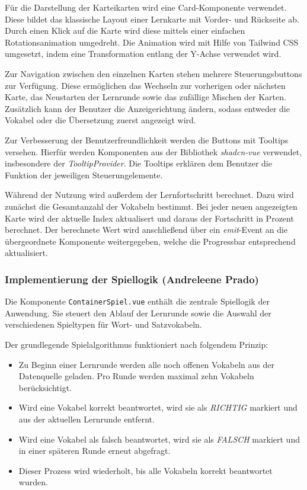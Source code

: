 Für die Darstellung der Karteikarten wird eine Card-Komponente verwendet.
Diese bildet das klassische Layout einer Lernkarte mit Vorder- und Rückseite ab.
Durch einen Klick auf die Karte wird diese mittels einer einfachen Rotationsanimation umgedreht.
Die Animation wird mit Hilfe von Tailwind CSS umgesetzt, indem eine Transformation entlang der Y-Achse verwendet wird.

Zur Navigation zwischen den einzelnen Karten stehen mehrere Steuerungsbuttons zur Verfügung.
Diese ermöglichen das Wechseln zur vorherigen oder nächsten Karte, das Neustarten der Lernrunde sowie das zufällige Mischen der Karten.
Zusätzlich kann der Benutzer die Anzeigerichtung ändern, sodass entweder die Vokabel oder die Übersetzung zuerst angezeigt wird.

Zur Verbesserung der Benutzerfreundlichkeit werden die Buttons mit Tooltips versehen.
Hierfür werden Komponenten aus der Bibliothek \textit{shadcn-vue} verwendet, insbesondere der \textit{TooltipProvider}.
Die Tooltips erklären dem Benutzer die Funktion der jeweiligen Steuerungelemente.

Während der Nutzung wird außerdem der Lernfortschritt berechnet.
Dazu wird zunächst die Gesamtanzahl der Vokabeln bestimmt.
Bei jeder neuen angezeigten Karte wird der aktuelle Index aktualisert und daraus der Fortschritt in Prozent berechnet.
Der berechnete Wert wird anschließend über ein \textit{emit}-Event an die übergeordnete Komponente weitergegeben, welche die Progressbar entsprechend aktualisiert.

\subsubsection{Implementierung der Spiellogik (Andreleene Prado)}
Die Komponente \texttt{ContainerSpiel.vue} enthält die zentrale Spiellogik der Anwendung.
Sie steuert den Ablauf der Lernrunde sowie die Auswahl der verschiedenen Spieltypen für Wort- und Satzvokabeln.

Der grundlegende Spielalgorithmus funktioniert nach folgendem Prinzip:
\begin{itemize}
    \item Zu Beginn einer Lernrunde werden alle noch offenen Vokabeln aus der Datenquelle geladen.
    Pro Runde werden maximal zehn Vokabeln berücksichtigt.
    \item Wird eine Vokabel korrekt beantwortet, wird sie als \textit{RICHTIG} markiert und aus der aktuellen Lernrunde entfernt.
    \item Wird eine Vokabel als falsch beantwortet, wird sie als \textit{FALSCH} markiert und in einer späteren Runde erneut abgefragt.
    \item Dieser Prozess wird wiederholt, bis alle Vokabeln korrekt beantwortet wurden.
\end{itemize}

